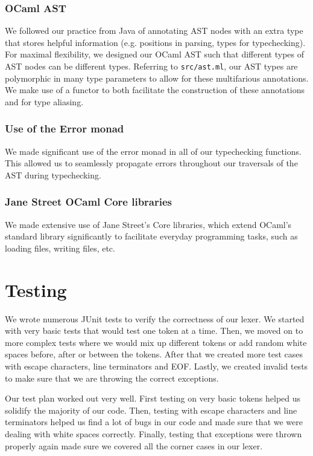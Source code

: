 \documentclass{hw}
\begin{document}
\subsubsection{OCaml AST}
We followed our practice from Java of annotating AST nodes with an extra type that
stores helpful information (e.g. positions in parsing, types for typechecking). For
maximal flexibility, we designed our OCaml AST such that different types of AST nodes
can be different types. Referring to \texttt{src/ast.ml}, our AST types are polymorphic
in many type parameters to allow for these multifarious annotations. We make use of a
functor to both facilitate the construction of these annotations and for type aliasing.

\subsubsection{Use of the Error monad}
We made significant use of the error monad in all of our typechecking functions. This
allowed us to seamlessly propagate errors throughout our traversals of the AST during
typechecking.

\subsubsection{Jane Street OCaml Core libraries}
We made extensive use of Jane Street's Core libraries, which extend OCaml's standard
library significantly to facilitate everyday programming tasks, such as loading files,
writing files, etc.

\section{Testing}\label{sec:testing}
We wrote numerous JUnit tests to verify the correctness of our lexer. We
started with very basic tests that would test one token at a time. Then, we
moved on to more complex tests where we would mix up different tokens or add
random white spaces before, after or between the tokens. After that we created
more test cases with escape characters, line terminators and EOF. Lastly, we
created invalid tests to make sure that we are throwing the correct exceptions.

Our test plan worked out very well. First testing on very basic tokens helped
us solidify the majority of our code. Then, testing with escape characters and
line terminators helped us find a lot of bugs in our code and made sure that we
were dealing with white spaces correctly.  Finally, testing that exceptions
were thrown properly again made sure we covered all the corner cases in our
lexer.
\end{document}
